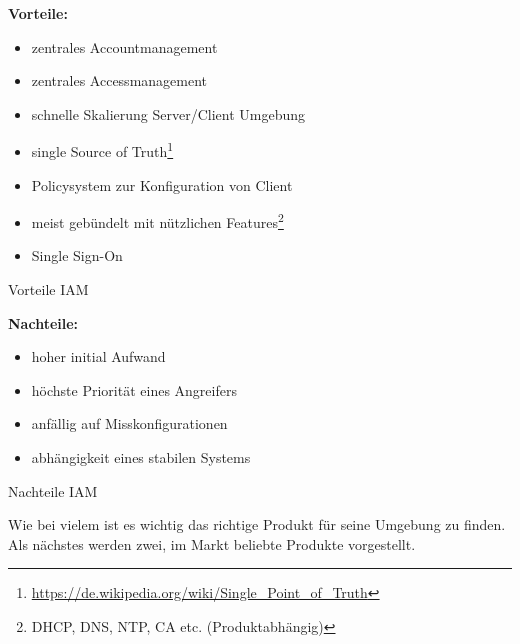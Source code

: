 \begin{minipage}{\linewidth}
    \begin{multicols}{2}
        \begin{table}[H]
            \begin{center}
                \textbf{Vorteile:}
                \begin{itemize}
                    \item zentrales Accountmanagement
                    \item zentrales Accessmanagement
                    \item schnelle Skalierung Server/Client Umgebung
                    \item single Source of Truth\footnote{\href{https://de.wikipedia.org/wiki/Single\_Point\_of\_Truth}{https://de.wikipedia.org/wiki/Single\_Point\_of\_Truth}}
                    \item Policysystem zur Konfiguration von Client
                    \item meist gebündelt mit nützlichen Features\footnote{DHCP, DNS, NTP, CA etc. (Produktabhängig)}
                    \item Single Sign-On
                \end{itemize}
            \end{center}
            \caption{Vorteile IAM}
        \end{table}
        \begin{table}[H]
            \begin{center}
                \textbf{Nachteile:}
                \begin{itemize}
                    \item hoher initial Aufwand
                    \item höchste Priorität eines Angreifers
                    \item anfällig auf Misskonfigurationen
                    \item abhängigkeit eines stabilen Systems
                \end{itemize}
            \end{center}
            \caption{Nachteile IAM}
        \end{table}
    \end{multicols}
\end{minipage}

\vspace{1cm}
Wie bei vielem ist es wichtig das richtige Produkt für seine Umgebung zu finden. Als nächstes werden zwei, im Markt beliebte Produkte vorgestellt.

